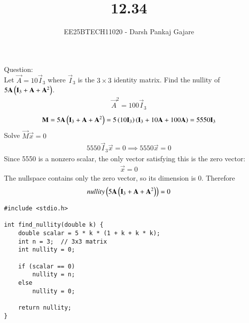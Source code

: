 \documentclass[journal,12pt,onecolumn]{IEEEtran}
\begin{document}
\title{12.34}
\author{EE25BTECH11020 - Darsh Pankaj Gajare}
{\let\newpage\relax\maketitle}
Question:\\ Let $\vec{A}=10\vec{I}_3$ where $\vec{I}_3$ is the $3\times3$ identity matrix. Find the nullity of $5\mathbf{A}\left(\mathbf{I}_3+\mathbf{A}+\mathbf{A}^2\right)$.
\solution
\begin{align}
	\vec{A}^2=100\vec{I}_3
\end{align}
\begin{align}
	\mathbf{M}=	5\mathbf{A}\left(\mathbf{I}_3+\mathbf{A}+\mathbf{A}^2\right)=5\left(10\mathbf{I}_3\right)\left(\mathbf{I}_3+10\mathbf{A}+100\mathbf{A}\right)=5550\mathbf{I}_3
\end{align}
Solve $\vec{M}\vec{x}=0$
\begin{align}
	5550\vec{I}_3\vec{x}=0 \implies 5550\vec{x}=0
\end{align}
Since 5550 is a nonzero scalar, the only vector satisfying this is the zero vector:
\begin{align}
	\vec{x}=0
\end{align}
The nullspace contains only the zero vector, so its dimension is 0. Therefore
\begin{align}
	nullity\left(5\mathbf{A}\left(\mathbf{I}_3+\mathbf{A}+\mathbf{A}^2\right)\right)=0
\end{align}
\begin{lstlisting}[caption=nullity.c]
#include <stdio.h>

int find_nullity(double k) {
    double scalar = 5 * k * (1 + k + k * k);
    int n = 3;  // 3x3 matrix
    int nullity = 0;

    if (scalar == 0)
        nullity = n;
    else
        nullity = 0;

    return nullity;
}
\end{lstlisting}
\end{document}
